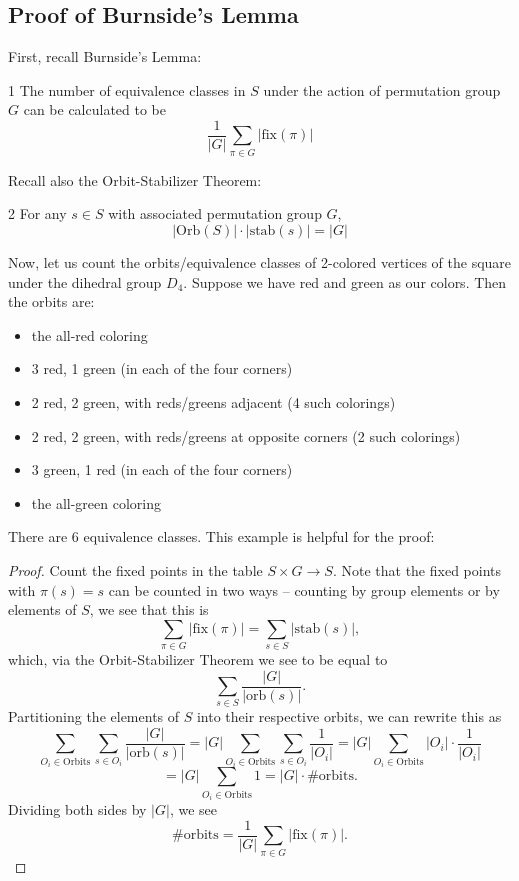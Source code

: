 \label{37-0508}
\subsection{Proof of Burnside's Lemma}
First, recall Burnside's Lemma: 

\begin{lemma}1
    The number of equivalence classes in $S$ under the action of permutation 
    group $G$ can be calculated to be
    \[ \frac 1{|G|} \sum_{\pi \in G} |\mathrm{fix}(\pi)| \]
\end{lemma}
Recall also the Orbit-Stabilizer Theorem: 
\begin{theorem}2
    For any $s \in S$ with associated permutation group $G$, 
    \[ |\text{Orb}(S)| \cdot |\text{stab}(s)| = |G| \]
\end{theorem}
Now, let us count the orbits/equivalence classes of 2-colored vertices of the
square under the dihedral group $D_4$. Suppose we have red and green as our colors. 
Then the orbits are: 
\begin{itemize}
    \item the all-red coloring 
    \item 3 red, 1 green (in each of the four corners)
    \item 2 red, 2 green, with reds/greens adjacent (4 such colorings)
    \item 2 red, 2 green, with reds/greens at opposite corners (2 such colorings)
    \item 3 green, 1 red (in each of the four corners)
    \item the all-green coloring 
\end{itemize}
There are 6 equivalence classes. This example is helpful for the proof: 
\begin{proof}
    Count the fixed points in the table $S \times G \to S$. Note that 
    the fixed points with $\pi(s) = s$ can be counted in two ways -- counting
    by group elements or by elements of $S$, we see that this is 
    \[ \sum_{\pi \in G} |\mathrm{fix}(\pi)| = \sum_{s \in S} |\text{stab}(s)|, \]
    which, via the Orbit-Stabilizer Theorem we see to be equal to $$\sum_{s \in S} \frac{|G|}{|\text{orb}(s)|}.$$ 
    Partitioning the elements of $S$ into their respective orbits, we can rewrite this
    as 
    \[
        \sum_{O_i \in \text{Orbits}} \sum_{s \in O_i} \frac{|G|}{|\text{orb}(s)|} = 
        |G| \sum_{O_i \in \text{Orbits}} \sum_{s \in O_i} \frac 1{|O_i|} =
        |G| \sum_{O_i \in \text{Orbits}} |O_i| \cdot \frac 1{|O_i|}
    \]
    \[
        = |G| \sum_{O_i \in \text{Orbits}} 1 = |G| \cdot \text{\#orbits}.
    \]
    Dividing both sides by $|G|$, we see 
    \[
        \text{\#orbits} = \frac 1{|G|}\sum_{\pi \in G} |\mathrm{fix}(\pi)|.
    \]

\end{proof}

